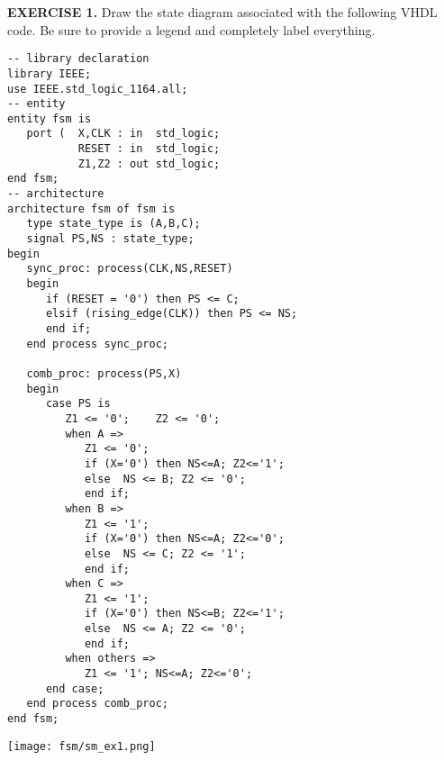 \vspace{20pt}
\noindent
\begin{minipage}{1\textwidth}
\textbf{EXERCISE 1.}
Draw the state diagram associated with the following VHDL code. Be sure to provide a legend and completely label everything.
\end{minipage}
\begin{minipage}{0.66\textwidth}
\vspace{10px}
\begin{lstlisting}
-- library declaration
library IEEE;
use IEEE.std_logic_1164.all;
-- entity
entity fsm is
   port (  X,CLK : in  std_logic;
           RESET : in  std_logic;
           Z1,Z2 : out std_logic;
end fsm;
-- architecture
architecture fsm of fsm is
   type state_type is (A,B,C);
   signal PS,NS : state_type;
begin
   sync_proc: process(CLK,NS,RESET)
   begin
      if (RESET = '0') then PS <= C;
      elsif (rising_edge(CLK)) then PS <= NS;
      end if;
   end process sync_proc;

   comb_proc: process(PS,X)
   begin
      case PS is
         Z1 <= '0';    Z2 <= '0';
         when A =>
            Z1 <= '0';
            if (X='0') then NS<=A; Z2<='1';
            else  NS <= B; Z2 <= '0';
            end if;
         when B =>
            Z1 <= '1';
            if (X='0') then NS<=A; Z2<='0';
            else  NS <= C; Z2 <= '1';
            end if;
         when C =>
            Z1 <= '1';
            if (X='0') then NS<=B; Z2<='1';
            else  NS <= A; Z2 <= '0';
            end if;
         when others =>
            Z1 <= '1'; NS<=A; Z2<='0';
      end case;
   end process comb_proc;
end fsm;
\end{lstlisting}
\end{minipage}
\begin{minipage}{0.33\textwidth}
\texttt{[image: fsm/sm\_ex1.png]}
\vspace{250px}
\end{minipage}

